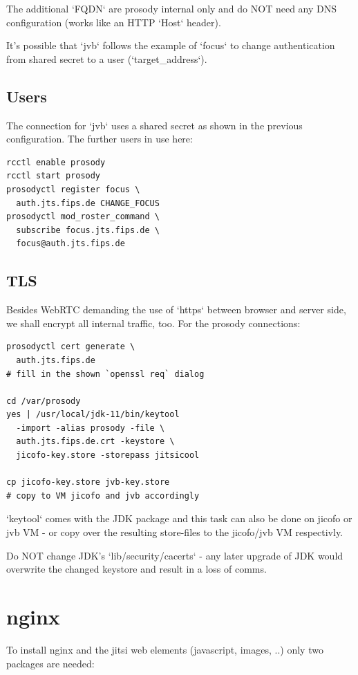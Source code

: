\documentclass[10pt,conference]{IEEEtran}
\begin{document}
The additional `FQDN` are prosody internal only and
do NOT need any DNS configuration (works like an
HTTP `Host` header).

It's possible that `jvb` follows the example of
`focus` to change authentication from shared secret
to a user (`target_address`).

\subsection{Users}
The connection for `jvb` uses a shared secret as shown in the previous configuration.
The further users in use here:

\begin{verbatim}
rcctl enable prosody
rcctl start prosody
prosodyctl register focus \
  auth.jts.fips.de CHANGE_FOCUS
prosodyctl mod_roster_command \
  subscribe focus.jts.fips.de \
  focus@auth.jts.fips.de
\end{verbatim}

\subsection{TLS}
Besides WebRTC demanding the use of `https` between browser and server side, we shall
encrypt all internal traffic, too. For the prosody connections:

\begin{verbatim}
prosodyctl cert generate \
  auth.jts.fips.de
# fill in the shown `openssl req` dialog

cd /var/prosody
yes | /usr/local/jdk-11/bin/keytool
  -import -alias prosody -file \
  auth.jts.fips.de.crt -keystore \
  jicofo-key.store -storepass jitsicool

cp jicofo-key.store jvb-key.store
# copy to VM jicofo and jvb accordingly
\end{verbatim}

`keytool` comes with the JDK package and this task can also be done on jicofo or jvb VM
- or copy over the resulting store-files to the jicofo/jvb VM respectivly.

Do NOT change JDK's `lib/security/cacerts` - any later upgrade of JDK
would overwrite the changed keystore and result in a loss of comms.

\section{nginx}
To install nginx and the jitsi web elements (javascript, images, ..) only two packages
are needed:
\end{document}
